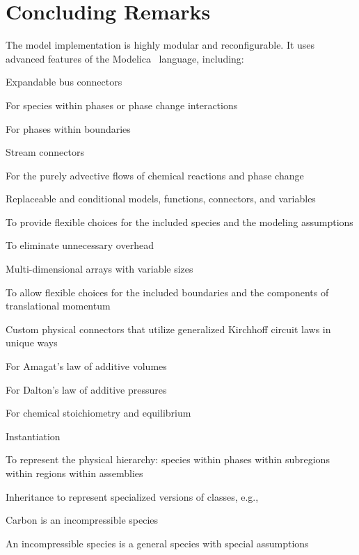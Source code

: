 \section{Concluding Remarks}

The model implementation is highly modular and reconfigurable.  It uses advanced features of the Modelica~\cite{Modelica3.3} language, including:
\begin{itemize*}
  \item Expandable bus connectors
  \begin{itemize*}
    \item For species within phases or phase change interactions
    \item For phases within boundaries
  \end{itemize*}
  \item Stream connectors
  \begin{itemize*}
    \item For the purely advective flows of chemical reactions and phase change
  \end{itemize*}
  \item Replaceable and conditional models, functions, connectors, and variables
  \begin{itemize*}
    \item To provide flexible choices for the included species and the modeling assumptions
    \item To eliminate unnecessary overhead
  \end{itemize*}
  \item Multi-dimensional arrays with variable sizes
  \begin{itemize*}
    \item To allow flexible choices for the included boundaries and the components of translational momentum
  \end{itemize*}
  \item Custom physical connectors that utilize generalized Kirchhoff circuit laws in unique ways
  \begin{itemize*}
    \item For Amagat's law of additive volumes
    \item For Dalton's law of additive pressures
    \item For chemical stoichiometry and equilibrium
  \end{itemize*}
  \item Instantiation
  \begin{itemize*}
    \item To represent the physical hierarchy: species within phases within subregions within regions within assemblies
  \end{itemize*}
  \item Inheritance to represent specialized versions of classes, e.g.,
  \begin{itemize*}
    \item Carbon is an incompressible species
    \item An incompressible species is a general species with special assumptions
  \end{itemize*}
\end{itemize*}

